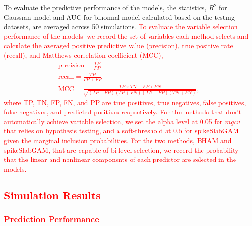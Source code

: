 \documentclass[AMA,STIX1COL,]{WileyNJD-v2}
\begin{document}
To evaluate the predictive performance of the models, the statistics,
\(R^2\) for Gaussian model and AUC for binomial model calculated based
on the testing datasets, are averaged across 50 simulations.
\textcolor{red}{To evaluate the variable selection performance of the models, we record the set of variables each method selects and calculate the averaged positive predictive value (precision), true positive rate (recall), and Matthews correlation coefficient (MCC),
\begin{align*}
&\text{precision} = \frac{TP}{PP}\\
&\text{recall} = \frac{TP}{TP+FP}\\
&\text{MCC} = \frac{TP\times TN - FP \times FN}{\sqrt{(TP+FP)(TP+FN)(TN+FP)(TN+FN)}},
\end{align*}
where TP, TN, FP, FN, and PP are true positives, true negatives, false positives, false negatives, and predicted positives respectively. For the methods that don't automatically achieve variable selection, we set the alpha level at 0.05 for \textit{mgcv} that relies on hypothesis testing, and a soft-threshold at 0.5 for spikeSlabGAM given the marginal inclusion probabilities. For the two methods, BHAM and spikeSlabGAM, that are capable of bi-level selection, we record the probability that the linear and nonlinear components of each predictor are selected in the models.}

\subsection{\textcolor{red}{Simulation Results}}
\subsubsection{\textcolor{red}{Prediction Performance}}
\end{document}
